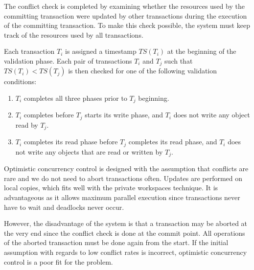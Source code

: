 The conflict check is completed by examining whether the resources used by the committing transaction were updated by other transactions during the execution of the committing transaction. To make this check possible, the system must keep track of the resources used by all transactions.

Each transaction $T_i$ is assigned a timestamp $TS(T_i)$ at the beginning of the validation phase. Each pair of transactions $T_i$ and $T_j$ such that $TS(T_i) < TS(T_j)$ is then checked for one of the following validation conditions: \begin{enumerate}
\item $T_i$ completes all three phases prior to $T_j$ beginning.
\item $T_i$ completes before $T_j$ starts its write phase, and $T_i$ does not write any object read by $T_j$.
\item $T_i$ completes its read phase before $T_j$ completes its read phase, and $T_i$ does not write any objects that are read or written by $T_j$.
\end{enumerate}

Optimistic concurrency control is designed with the assumption that conflicts are rare and we do not need to abort transactions often. Updates are performed on local copies, which fits well with the private workspaces technique. It is advantageous as it allows maximum parallel execution since transactions never have to wait and deadlocks never occur. 

However, the disadvantage of the system is that a transaction may be aborted at the very end since the conflict check is done at the commit point. All operations of the aborted transaction must be done again from the start. If the initial assumption with regards to low conflict rates is incorrect, optimistic concurrency control is a poor fit for the problem.
